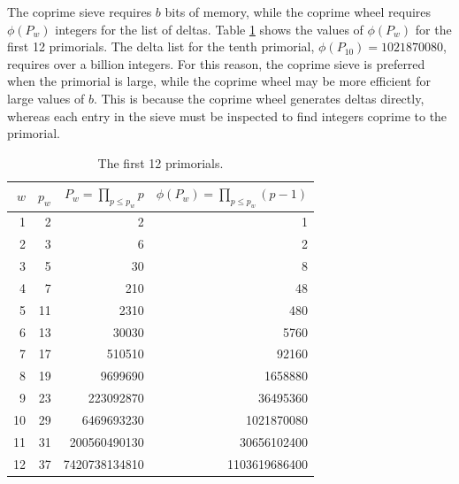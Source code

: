 \documentclass{ucalgthes1}
\theoremstyle{definition}
\begin{document}
The coprime sieve requires $b$ bits of memory, while the coprime wheel requires $\phi(P_w)$ integers for the list of deltas.  Table \ref{tab:primorialRateOfGrowth} shows the values of $\phi(P_w)$ for the first 12 primorials.  The delta list for the tenth primorial, $\phi(P_{10}) = 1021870080$, requires over a billion integers.  For this reason, the coprime sieve is preferred when the primorial is large, while the coprime wheel may be more efficient for large values of $b$.  This is because the coprime wheel generates deltas directly, whereas each entry in the sieve must be inspected to find integers coprime to the primorial.

\begin{table}[htb]
\centering
\begin{tabular}{| r | r | r | r |}
	\hline
	$w$ & $p_w$ & $P_w = \prod_{p \le p_w} p$ & $\phi(P_w) = \prod_{p \le p_w} (p-1)$ \\
	\hline
1 & 2 & 2 & 1 \\
2 & 3 & 6 & 2 \\
3 & 5 & 30 & 8 \\
4 & 7 & 210 & 48 \\
5 & 11 & 2310 & 480 \\
6 & 13 & 30030 & 5760 \\
7 & 17 & 510510 & 92160 \\
8 & 19 & 9699690 & 1658880 \\
9 & 23 & 223092870 & 36495360 \\
10 & 29 & 6469693230 & 1021870080 \\
11 & 31 & 200560490130 & 30656102400 \\
12 & 37 & 7420738134810 & 1103619686400 \\
	\hline
\end{tabular}
\caption{The first 12 primorials.}
\label{tab:primorialRateOfGrowth}
\end{table}
\end{document}
